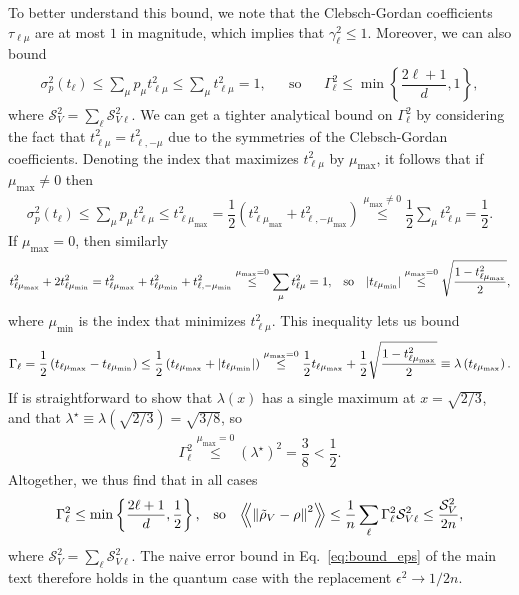\documentclass[notitlepage,twocolumn]{revtex4-2}
\renewcommand{\t}{\text} %
\newcommand{\f}[2]{\dfrac{#1}{#2}} %
\newcommand{\p}[1]{\left(#1\right)} %
\renewcommand{\Set}[1]{\left\{#1\right\}} %
\newcommand{\Bbk}[1]
{\left\langle\!\!\left\langle #1 \right\rangle\!\!\right\rangle}
\renewcommand{\S}{\mathcal{S}}
\begin{document}
To better understand this bound, we note that the Clebsch-Gordan coefficients $\tau_{\ell\mu}$ are at most $1$ in magnitude, which implies that $\gamma_\ell^2\le 1$.
Moreover, we can also bound
\begin{align}
  \sigma_p^2\p{t_\ell} \le \sum_\mu p_\mu t_{\ell\mu}^2
  \le \sum_\mu t_{\ell\mu}^2 = 1,
  &&
  \t{so}
  &&
  \Gamma_\ell^2 \le \min\Set{\f{2\ell+1}{d}, 1},
\end{align}
where $\S_V^2=\sum_\ell\S_{V\ell}^2$.
We can get a tighter analytical bound on $\Gamma_\ell^2$ by considering the fact that $t_{\ell\mu}^2 = t_{\ell,-\mu}^2$ due to the symmetries of the Clebsch-Gordan coefficients.
Denoting the index that maximizes $t_{\ell\mu}^2$ by $\mu_{\t{max}}$, it follows that if $\mu_{\t{max}}\ne0$ then
\begin{align}
  \sigma_p^2\p{t_\ell} \le \sum_\mu p_\mu t_{\ell\mu}^2
  \le t_{\ell\mu_{\t{max}}}^2
  = \f12 \p{t_{\ell\mu_{\t{max}}}^2 + t_{\ell,-\mu_{\t{max}}}^2}
  \stackrel{\mu_{\t{max}}\ne0}{\le} \f12 \sum_\mu t_{\ell\mu}^2
  = \f12.
\end{align}
If $\mu_{\t{max}}=0$, then similarly
\begin{align}
  t_{\ell\mu_{\t{max}}}^2 + 2 t_{\ell\mu_{\t{min}}}^2
  = t_{\ell\mu_{\t{max}}}^2 + t_{\ell\mu_{\t{min}}}^2
  + t_{\ell,-\mu_{\t{min}}}^2
  \stackrel{\mu_{\t{max}}=0}{\le}
  \sum_\mu t_{\ell\mu}^2 = 1,
  &&
  \t{so}
  &&
  \abs{t_{\ell\mu_{\t{min}}}}
  \stackrel{\mu_{\t{max}}=0}{\le}
  \sqrt{\f{1 - t_{\ell\mu_{\t{max}}}^2}{2}},
\end{align}
where $\mu_{\t{min}}$ is the index that minimizes $t_{\ell\mu}^2$.
This inequality lets us bound
\begin{align}
  \Gamma_\ell
  = \f12 \p{t_{\ell\mu_{\t{max}}} - t_{\ell\mu_{\t{min}}}}
  \le \f12 \p{t_{\ell\mu_{\t{max}}} + \abs{t_{\ell\mu_{\t{min}}}}}
  \stackrel{\mu_{\t{max}}=0}{\le}
  \f12 t_{\ell\mu_{\t{max}}}
  + \f12\sqrt{\f{1 - t_{\ell\mu_{\t{max}}}^2}{2}}
  \equiv \lambda\p{t_{\ell\mu_{\t{max}}}}.
\end{align}
If is straightforward to show that $\lambda\p{x}$ has a single maximum at $x=\sqrt{2/3}$, and that $\lambda^\star\equiv \lambda\p{\sqrt{2/3}}=\sqrt{3/8}$, so
\begin{align}
  \Gamma_\ell^2
  \stackrel{\mu_{\t{max}}=0}{\le} \p{\lambda^\star}^2
  = \f38 < \f12.
\end{align}
Altogether, we thus find that in all cases
\begin{align}
  \Gamma_\ell^2 \le \min\Set{\f{2\ell+1}{d}, \f12},
  &&
  \t{so}
  &&
  \Bbk{\norm{\tilde\rho_V-\rho}^2}
  \le \f1n \sum_\ell \Gamma_\ell^2 \S_{V\ell}^2
  \le \f{\S_V^2}{2n},
\end{align}
where $\S_V^2 = \sum_\ell \S_{V\ell}^2$.
The naive error bound in Eq.~\eqref{eq:bound_eps} of the main text therefore holds in the quantum case with the replacement $\epsilon^2\to1/2n$.
\end{document}
